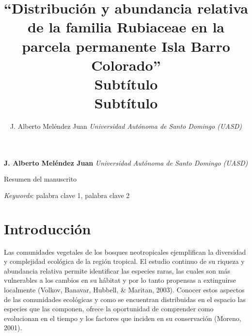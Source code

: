 \documentclass[11pt,]{article}
\title{``Distribución y abundancia relativa de la familia Rubiaceae en la
parcela permanente Isla Barro Colorado''\\
Subtítulo\\
Subtítulo  }
\author{\Large J. Alberto Meléndez Juan\vspace{0.05in} \newline\normalsize\emph{Universidad Autónoma de Santo Domingo (UASD)}  }
\date{}
\newcommand*{\authorfont}{\fontfamily{phv}\selectfont}
\renewenvironment{abstract}
 {{%
    \setlength{\leftmargin}{0mm}
    \setlength{\rightmargin}{\leftmargin}%
  }%
  \relax}
 {\endlist}
\begin{document}
	
%

{%
\setlength{\parindent}{0pt}
\thispagestyle{plain}
{\fontsize{18}{20}\selectfont\raggedright 
\maketitle  %

}

{
   \vskip 13.5pt\relax \normalsize\fontsize{11}{12} 
\textbf{\authorfont J. Alberto Meléndez Juan} \hskip 15pt \emph{\small Universidad Autónoma de Santo Domingo (UASD)}   

}

}








\begin{abstract}

    \hbox{\vrule height .2pt width 39.14pc}

    \vskip 8.5pt %

\noindent Resumen del manuscrito


\vskip 8.5pt \noindent \emph{Keywords}: palabra clave 1, palabra clave 2 \par

    \hbox{\vrule height .2pt width 39.14pc}



\end{abstract}


\vskip 6.5pt


\noindent  \section{Introducción}\label{introducciuxf3n}

Las comunidades vegetales de los bosques neotropicales ejemplifican la
diversidad y complejidad ecológica de la región tropical. El estudio
continuo de su riqueza y abundancia relativa permite identificar las
especies raras, las cuales son más vulnerables a los cambios en su
hábitat y por lo tanto propensas a extinguirse localmente (Volkov,
Banavar, Hubbell, \& Maritan, 2003). Conocer estos aspectos de las
comunidades ecológicas y como se encuentran distribuidas en el espacio
las especies que las componen, ofrece la oportunidad de comprender como
evolucionan en el tiempo y los factores que inciden en su conservación
(Moreno, 2001).
\end{document}
